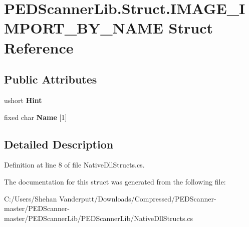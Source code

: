 \hypertarget{struct_p_e_d_scanner_lib_1_1_struct_1_1_i_m_a_g_e___i_m_p_o_r_t___b_y___n_a_m_e}{}\section{P\+E\+D\+Scanner\+Lib.\+Struct.\+I\+M\+A\+G\+E\+\_\+\+I\+M\+P\+O\+R\+T\+\_\+\+B\+Y\+\_\+\+N\+A\+ME Struct Reference}
\label{struct_p_e_d_scanner_lib_1_1_struct_1_1_i_m_a_g_e___i_m_p_o_r_t___b_y___n_a_m_e}
\subsection*{Public Attributes}
\begin{DoxyCompactItemize}
\item 
\mbox{\label{struct_p_e_d_scanner_lib_1_1_struct_1_1_i_m_a_g_e___i_m_p_o_r_t___b_y___n_a_m_e_ad954f6111635f9cb040ae87e36059162}} 
ushort {\bfseries Hint}
\item 
\mbox{\label{struct_p_e_d_scanner_lib_1_1_struct_1_1_i_m_a_g_e___i_m_p_o_r_t___b_y___n_a_m_e_a756ed2b79c5bd9270f1345f75d01159d}} 
fixed char {\bfseries Name} \mbox{[}1\mbox{]}
\end{DoxyCompactItemize}


\subsection{Detailed Description}


Definition at line 8 of file Native\+Dll\+Structs.\+cs.



The documentation for this struct was generated from the following file\+:\begin{DoxyCompactItemize}
\item 
C\+:/\+Users/\+Shehan Vanderputt/\+Downloads/\+Compressed/\+P\+E\+D\+Scanner-\/master/\+P\+E\+D\+Scanner-\/master/\+P\+E\+D\+Scanner\+Lib/\+P\+E\+D\+Scanner\+Lib/Native\+Dll\+Structs.\+cs\end{DoxyCompactItemize}
